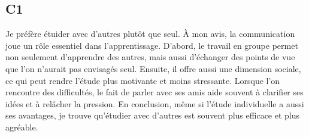 \documentclass{book}
\begin{document}
    \subsection{C1}
        Je préfère étuider avec d'autres plutôt que seul.
        À mon avis, la communication joue un rôle essentiel dans l'apprentissage.
        D'abord, le travail en groupe permet non seulement d'apprendre des autres, 
        mais aussi d'échanger des points de vue que l'on n'aurait pas envisagés seul.
        Ensuite, il offre aussi une dimension sociale, ce qui peut rendre l'étude plus motivante et moins stressante.
        Lorsque l'on rencontre des difficultés, le fait de parler avec ses amis aide souvent à clarifier ses idées et à relâcher la pression.
        En conclusion, même si l'étude individuelle a aussi ses avantages, je trouve qu'étudier avec d'autres est souvent plus efficace et plus agréable.
\end{document}

